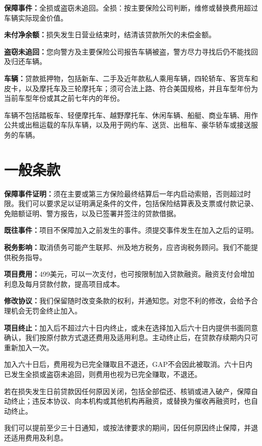 \documentclass[UTF8,fontset=none,11pt,a4paper]{ctexart}
\begin{document}
\textbf{保障事件：}全损或盗窃未追回。全损：按主要保险公司判断，维修或替换费用超过车辆实际\allowbreak\mbox{现金价值。}


\textbf{未付净余额：}损失发生日营业结束时，结清该贷款所欠的\allowbreak\mbox{未偿金额。}


\textbf{盗窃未追回：}您向警方及主要保险公司报告车辆被盗，警方尽力寻找后仍不能找回及\allowbreak\mbox{归还车辆。}


\textbf{车辆：}贷款抵押物，包括新车、二手及近年款私人乘用车辆，四轮轿车、客货车和皮卡，以及摩托车及三轮摩托车；须可合法上路、符合美国规格，并且车型年份为当前车型年份或其之前七年\allowbreak\mbox{内的年份。}


车辆不包括踏板车、轻便摩托车、越野摩托车、休闲车辆、船艇、商业车辆、用作公共或出租运载的车队车辆，以及用于网约车、送货、出租车、豪华轿车或接送服\allowbreak\mbox{务的车辆。}


\section*{一般条款}
\textbf{保障事件证明：}须在主要或第三方保险最终结算后一年内启动索赔，否则超过时限。我们可以要求足以证明满足条件的文件，包括保险结算表及支票或付款记录、免赔额证明、警方报告，以及已签署并签注的\allowbreak\mbox{贷款借据。}


\textbf{既往事件：}项目不保障加入之前发生的事件。须提交事件发生在加入之\allowbreak\mbox{后的证明。}


\textbf{税务影响：}取消债务可能产生联邦、州及地方税务，应咨询税务顾问。我们不能提供\allowbreak\mbox{税务指导。}


\textbf{项目费用：}499美元，可以一次支付，也可按限制加入贷款融资。融资支付会增加利息及每月贷款付款，提高\allowbreak\mbox{项目成本。}


\textbf{修改协议：}我们保留随时改变条款的权利，并通知您。对您不利的修改，会给予合理机会无罚金\allowbreak\mbox{终止加入。}


\textbf{项目终止：}加入后不超过六十日内终止，或未在选择加入后六十日内提供书面同意确认，我们按原付款方式退还费用及适用利息。主动终止后，在贷款存续期内只可重新\allowbreak\mbox{加入一次。}


加入六十日后，费用视为已完全赚取且不退还，GAP不会因此被取消。六十日内已发生全损或盗窃未追回，则费用也视为已完全赚取，不退还。


若在损失发生日前贷款因任何原因关闭，包括全部偿还、核销或进入破产，保障自动终止；违反本协议、向本机构或其他机构再融资，或替换为催收再融资时，也\allowbreak\mbox{自动终止。}


我们可以提前至少三十日通知，或按法律要求的期间，因任何原因终止保障，并退还适用费\allowbreak\mbox{用及利息。}
\end{document}
